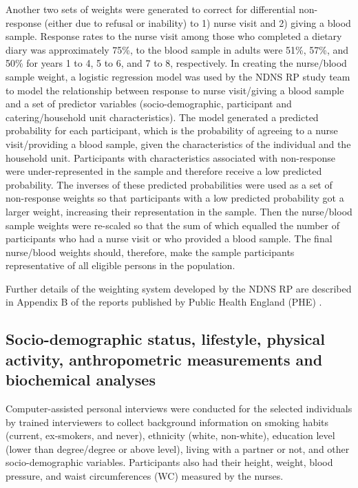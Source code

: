 Another two sets of weights were generated to correct for differential non-response (either due to refusal or inability) to 1) nurse visit and 2) giving a blood sample. Response rates to the nurse visit among those who completed a dietary diary was approximately 75\%, to the blood sample in adults were 51\%, 57\%, and 50\% for years 1 to 4, 5 to 6, and 7 to 8, respectively. In creating the nurse/blood sample weight, a logistic regression model was used by the NDNS RP study team to model the relationship between response to nurse visit/giving a blood sample and a set of predictor variables (socio-demographic, participant and catering/household unit characteristics). The model generated a predicted probability for each participant, which is the probability of agreeing to a nurse visit/providing a blood sample, given the characteristics of the individual and the household unit. Participants with characteristics associated with non-response were under-represented in the sample and therefore receive a low predicted probability. The inverses of these predicted probabilities were used as a set of non-response weights so that participants with a low predicted probability got a larger weight, increasing their representation in the sample. Then the nurse/blood sample weights were re-scaled so that the sum of which equalled the number of participants who had a nurse visit or who provided a blood sample. The final nurse/blood weights should, therefore, make the sample participants representative of all eligible persons in the population. 

Further details of the weighting system developed by the NDNS RP are described in Appendix B of the reports published by Public Health England (PHE) \parencite{bates2014national,roberts2018national,NDNSofficial}.\vspace{-0.6cm}

\subsection{Socio-demographic status, lifestyle, physical activity, anthropometric measurements and biochemical analyses}\vspace{-0.3cm}

Computer-assisted personal interviews were conducted for the selected individuals by trained interviewers to collect background information on smoking habits (current, ex-smokers, and never), ethnicity (white, non-white), education level (lower than degree/degree or above level), living with a partner or not, and other socio-demographic variables. Participants also had their height, weight, blood pressure, and waist circumferences (WC) measured by the nurses. 

